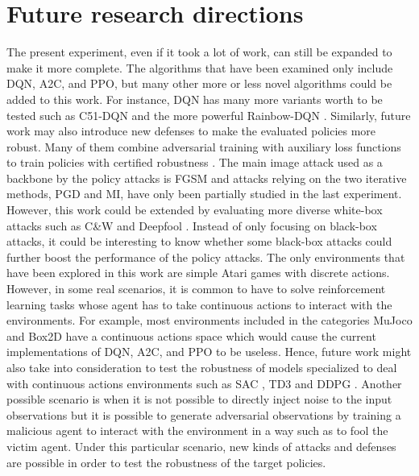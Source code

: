 \section{Future research directions}
The present experiment, even if it took a lot of work, can still be expanded to make it more complete. The algorithms that have been examined only include DQN, A2C, and PPO, but many other more or less novel algorithms could be added to this work. For instance, DQN has many more variants worth to be tested such as C51-DQN \cite{bellemare2017distributional} and the more powerful Rainbow-DQN \cite{hessel2017rainbow}. Similarly, future work may also introduce new defenses to make the evaluated policies more robust. Many of them combine adversarial training with auxiliary loss functions to train policies with certified robustness \cite{wang2020adversarial} \cite{fischer2019online} \cite{zhang2020robust} \cite{oikarinen2020robust}. The main image attack used as a backbone by the policy attacks is FGSM and attacks relying on the two iterative methods, PGD and MI, have only been partially studied in the last experiment. However, this work could be extended by evaluating more diverse white-box attacks such as C\&W \cite{carlini2016evaluating} and Deepfool \cite{moosavidezfooli2016deepfool}. Instead of only focusing on black-box attacks, it could be interesting to know whether some black-box attacks could further boost the performance of the policy attacks. The only environments that have been explored in this work are simple Atari games with discrete actions. However, in some real scenarios, it is common to have to solve reinforcement learning tasks whose agent has to take continuous actions to interact with the environments. For example, most environments included in the categories MuJoco and Box2D have a continuous actions space which would cause the current implementations of DQN, A2C, and PPO to be useless. Hence, future work might also take into consideration to test the robustness of models specialized to deal with continuous actions environments such as SAC \cite{haarnoja2018soft}, TD3 \cite{fujimoto2018addressing} and DDPG \cite{lillicrap2019continuous}. Another possible scenario is when it is not possible to directly inject noise to the input observations but it is possible to generate adversarial observations by training a malicious agent to interact with the environment in a way such as to fool the victim agent. Under this particular scenario, new kinds of attacks and defenses are possible in order to test the robustness of the target policies.
